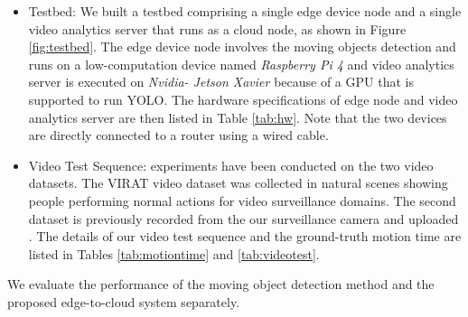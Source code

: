\begin{itemize}
\item Testbed: We built a testbed comprising a single edge device node and a single video analytics server that runs as a cloud node, as shown in Figure \ref{fig:testbed}. The edge device node involves the moving objects detection and runs on a low-computation device named \textit{Raspberry Pi 4} and video analytics server is executed on \textit{Nvidia- Jetson Xavier} because of a GPU that is supported to run YOLO. The hardware specifications of edge node and video analytics server are then listed in Table \ref{tab:hw}. Note that the two devices are directly connected to a router using a wired cable.
\item Video Test Sequence: experiments have been conducted on the two video datasets. The VIRAT video dataset \cite{VIRAT} was collected in natural scenes showing people performing normal actions for video surveillance domains. The second dataset is previously recorded from the our surveillance camera and uploaded \cite{testvideo}. The details of our video test sequence and the ground-truth motion time are listed in Tables \ref{tab:motiontime} and \ref{tab:videotest}. 
\end{itemize}
We evaluate the performance of the moving object detection method and the proposed edge-to-cloud system separately.

